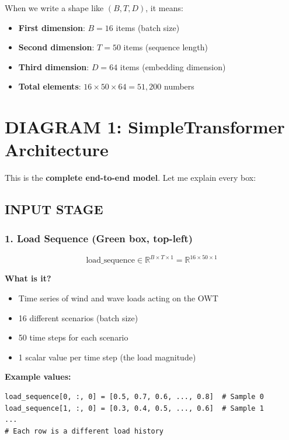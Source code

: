 \documentclass[11pt,a4paper]{article}
\begin{document}
When we write a shape like $(B, T, D)$, it means:
\begin{itemize}
  \item \textbf{First dimension}: $B = 16$ items (batch size)
  \item \textbf{Second dimension}: $T = 50$ items (sequence length)
  \item \textbf{Third dimension}: $D = 64$ items (embedding dimension)
  \item \textbf{Total elements}: $16 \times 50 \times 64 = 51,200$ numbers
\end{itemize}

\section{DIAGRAM 1: SimpleTransformer Architecture}

This is the \textbf{complete end-to-end model}. Let me explain every box:

\subsection{INPUT STAGE}

\subsubsection{1. Load Sequence (Green box, top-left)}

\begin{equation}
\text{load\_sequence} \in \mathbb{R}^{B \times T \times 1} = \mathbb{R}^{16 \times 50 \times 1}
\end{equation}

\textbf{What is it?}
\begin{itemize}
  \item Time series of wind and wave loads acting on the OWT
  \item 16 different scenarios (batch size)
  \item 50 time steps for each scenario
  \item 1 scalar value per time step (the load magnitude)
\end{itemize}

\textbf{Example values:}
\begin{lstlisting}
load_sequence[0, :, 0] = [0.5, 0.7, 0.6, ..., 0.8]  # Sample 0
load_sequence[1, :, 0] = [0.3, 0.4, 0.5, ..., 0.6]  # Sample 1
...
# Each row is a different load history
\end{lstlisting}
\end{document}
